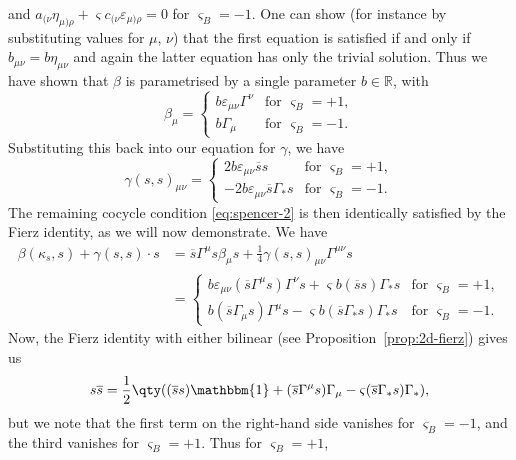 \documentclass[pdftex]{sigma}
\numberwithin{equation}{section}
\newcommand{\RR}{\mathbb{R}}
\newcommand{\1}{\mathbbm{1}}
\begin{document}
 and $
	a_{(\nu}\eta_{\mu)\rho}+\varsigma c_{(\nu}\varepsilon_{\mu)\rho} = 0$
 for $ \varsigma_B=-1$.
One can show (for instance by substituting values for $\mu$, $\nu$) that the first equation is satisfied if and only if $b_{\mu\nu}=b\eta_{\mu\nu}$ and again the latter equation has only the trivial solution. Thus we have shown that $\beta$ is parametrised by a single parameter $b\in \RR$, with
\begin{equation}\label{eq:2d-real-beta-soln}
	\beta_\mu =
	\begin{cases}
		b\varepsilon_{\mu\nu}\Gamma^\nu	& \text{for } \varsigma_B=+1,\\
		b\Gamma_\mu						& \text{for } \varsigma_B=-1.
	\end{cases}
\end{equation}
Substituting this back into our equation for $\gamma$, we have
\begin{equation}\label{eq:2d-real-gamma-soln}
	\gamma(s,s)_{\mu\nu} =
	\begin{cases}
		2b\varepsilon_{\mu\nu}\overline{s}s				& \text{for } \varsigma_B=+1,\\
		-2b\varepsilon_{\mu\nu}\overline{s}\Gamma_*s	& \text{for } \varsigma_B=-1.
	\end{cases}
\end{equation}
The remaining cocycle condition \eqref{eq:spencer-2} is then identically satisfied by the Fierz identity, as we will now demonstrate. We have
\begin{align*}
	\beta(\kappa_s,s) + \gamma(s,s)\cdot s
		&= \overline{s}\Gamma^\mu s \beta_\mu s + \frac{1}{4}\gamma(s,s)_{\mu\nu}\Gamma^{\mu\nu}s	\\
		&=
			\begin{cases}
				b\varepsilon_{\mu\nu}(\overline{s}\Gamma^\mu s)\Gamma^\nu s + \varsigma b(\overline{s}s)\Gamma_* s	& \text{for } \varsigma_B=+1, 	\\
				b(\overline{s}\Gamma_\mu s)\Gamma^\mu s - \varsigma b(\overline{s}\Gamma_* s)\Gamma_* s & \text{for } \varsigma_B=-1.
			\end{cases}
\end{align*}
Now, the Fierz identity with either bilinear (see Proposition~\ref{prop:2d-fierz}) gives us
\[
	s\overline{s} = \frac{1}{2}\qty((\overline{s}s)\1 + (\overline{s}\Gamma^\mu s)\Gamma_\mu - \varsigma(\overline{s}\Gamma_* s) \Gamma_*),
\]
but we note that the first term on the right-hand side vanishes for $\varsigma_B=-1$, and the third vanishes for $\varsigma_B=+1$. Thus for $\varsigma_B=+1$,
\end{document}
